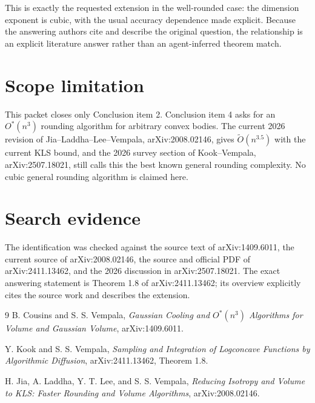\documentclass[11pt]{article}
\begin{document}
This is exactly the requested extension in the well-rounded case: the
dimension exponent is cubic, with the usual accuracy dependence made
explicit.  Because the answering authors cite and describe the original
question, the relationship is an explicit literature answer rather than an
agent-inferred theorem match.

\section*{Scope limitation}

This packet closes only Conclusion item 2.  Conclusion item 4 asks for an
$O^*(n^3)$ rounding algorithm for arbitrary convex bodies.  The current 2026
revision of Jia--Laddha--Lee--Vempala, arXiv:2008.02146, gives
$\widetilde O(n^{3.5})$ with the current KLS bound, and the 2026 survey section
of Kook--Vempala, arXiv:2507.18021, still calls this the best known general
rounding complexity.  No cubic general rounding algorithm is claimed here.

\section*{Search evidence}

The identification was checked against the source text of arXiv:1409.6011,
the current source of arXiv:2008.02146, the source and official PDF of
arXiv:2411.13462, and the 2026 discussion in arXiv:2507.18021.  The exact
answering statement is Theorem 1.8 of arXiv:2411.13462; its overview explicitly
cites the source work and describes the extension.

\begin{thebibliography}{9}
B. Cousins and S. S. Vempala,
\emph{Gaussian Cooling and $O^*(n^3)$ Algorithms for Volume and Gaussian
Volume}, arXiv:1409.6011.

Y. Kook and S. S. Vempala,
\emph{Sampling and Integration of Logconcave Functions by Algorithmic
Diffusion}, arXiv:2411.13462, Theorem 1.8.

H. Jia, A. Laddha, Y. T. Lee, and S. S. Vempala,
\emph{Reducing Isotropy and Volume to KLS: Faster Rounding and Volume
Algorithms}, arXiv:2008.02146.
\end{thebibliography}
\end{document}
